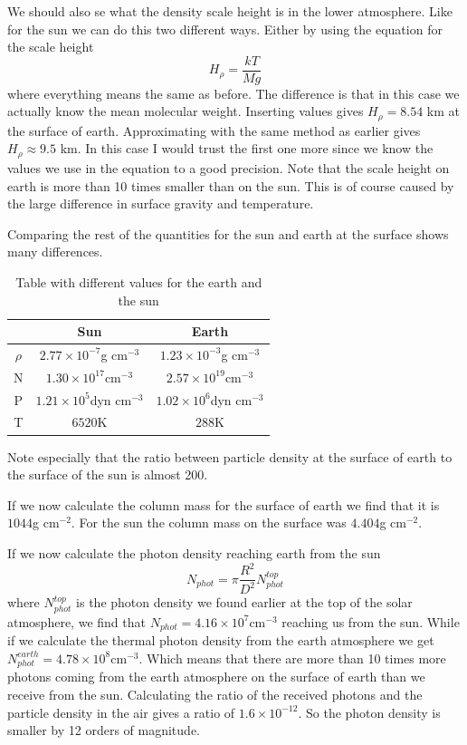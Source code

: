\documentclass{aa}   %
\begin{document}
We should also se what the density scale height is in the lower atmosphere. Like for the sun we can do this two different ways. Either by using the equation for the scale height
\begin{equation}
 H_\rho = \frac{kT}{Mg}
\end{equation}
where everything means the same as before. The difference is that in this case we actually know the mean molecular weight. Inserting values gives $H_\rho = 8.54$ km at the surface of earth. Approximating with the same method as earlier gives $H_\rho \approx 9.5$ km. In this case I would trust the first one more since we know the values we use in the equation to a good precision. Note that the scale height on earth is more than 10 times smaller than on the sun. This is of course caused by the large difference in surface gravity and temperature.

Comparing the rest of the quantities for the sun and earth at the surface shows many differences.
\begin{table}
\begin{tabular}{|c|c|c|}
\hline
&Sun & Earth\\
\hline
$\rho$ &$2.77\times 10^{-7}$g cm$^{-3}$ &$1.23\times 10^{-3}$g cm$^{-3}$\\
\hline
N &$1.30\times10^{17}$cm$^{-3}$ &$2.57\times10^{19}$cm$^{-3}$ \\
\hline
P &$1.21\times10^{5}$dyn cm$^{-3}$ &$1.02\times10^{6}$dyn cm$^{-3}$ \\
\hline
T &$6520$K &$288$K\\
\hline
\end{tabular}
\caption{Table with different values for the earth and the sun}
\end{table}
Note especially that the ratio between particle density at the surface of earth to the surface of the sun is almost 200.

If we now calculate the column mass for the surface of earth we find that it is $1044$g cm$^{-2}$. For the sun the column mass on the surface was $4.404$g cm$^{-2}$.

If we now calculate the photon density reaching earth from the sun
\begin{equation}
 N_{phot} = \pi \frac{R^2}{D^2}N_{phot}^{top}
\end{equation}
where $N_{phot}^{top}$ is the photon density we found earlier at the top of the solar atmosphere, we find that $N_{phot} = 4.16\times10^{7}$cm$^{-3}$ reaching us from the sun.
While if we calculate the thermal photon density from the earth atmosphere we get $N_{phot}^{earth} = 4.78\times 10^8$cm$^{-3}$. Which means that there are more than 10 times more photons coming from the earth atmosphere on the surface of earth than we receive from the sun. Calculating the ratio of the received photons and the particle density in the air gives a ratio of $1.6\times 10^{-12}$. So the photon density is smaller by 12 orders of magnitude.
\end{document}
